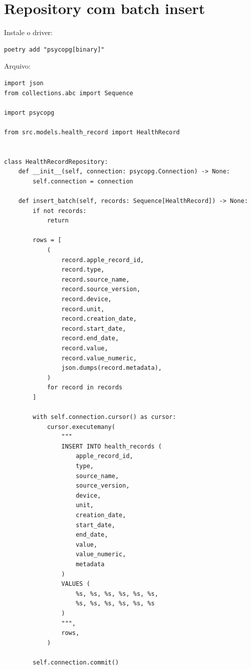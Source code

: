 \section{Repository com batch insert}

Instale o driver:

\begin{lstlisting}[style=devbutterbash]
poetry add "psycopg[binary]"
\end{lstlisting}

Arquivo: 

\begin{lstlisting}[style=devbutterpython]
import json
from collections.abc import Sequence

import psycopg

from src.models.health_record import HealthRecord


class HealthRecordRepository:
    def __init__(self, connection: psycopg.Connection) -> None:
        self.connection = connection

    def insert_batch(self, records: Sequence[HealthRecord]) -> None:
        if not records:
            return

        rows = [
            (
                record.apple_record_id,
                record.type,
                record.source_name,
                record.source_version,
                record.device,
                record.unit,
                record.creation_date,
                record.start_date,
                record.end_date,
                record.value,
                record.value_numeric,
                json.dumps(record.metadata),
            )
            for record in records
        ]

        with self.connection.cursor() as cursor:
            cursor.executemany(
                """
                INSERT INTO health_records (
                    apple_record_id,
                    type,
                    source_name,
                    source_version,
                    device,
                    unit,
                    creation_date,
                    start_date,
                    end_date,
                    value,
                    value_numeric,
                    metadata
                )
                VALUES (
                    %s, %s, %s, %s, %s, %s,
                    %s, %s, %s, %s, %s, %s
                )
                """,
                rows,
            )

        self.connection.commit()
\end{lstlisting}

